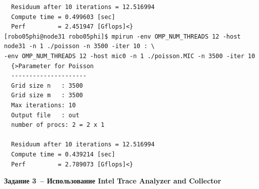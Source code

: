\documentclass[pscyr,10pt]{hedlab}
\begin{document}
\begin{lstlisting}
  Residuum after 10 iterations = 12.516994 
  Compute time = 0.499603 [sec]
  Perf         = 2.451947 [Gflops]<}
[robo05phi@node31 robo05phi]$ mpirun -env OMP_NUM_THREADS 12 -host node31 -n 1 ./poisson -n 3500 -iter 10 : \
-env OMP_NUM_THREADS 12 -host mic0 -n 1 ./poisson.MIC -n 3500 -iter 10
  {>Parameter for Poisson
  ---------------------
  Grid size n   : 3500
  Grid size m   : 3500
  Max iterations: 10
  Output file   : out
  number of procs: 2 = 2 x 1
  
  Residuum after 10 iterations = 12.516994 
  Compute time = 0.439214 [sec]
  Perf         = 2.789073 [Gflops]<}
\end{lstlisting}

  \begin{center}
    \textbf{Задание 3~-- Использование Intel Trace Analyzer and Collector}
  \end{center}
\end{document}
